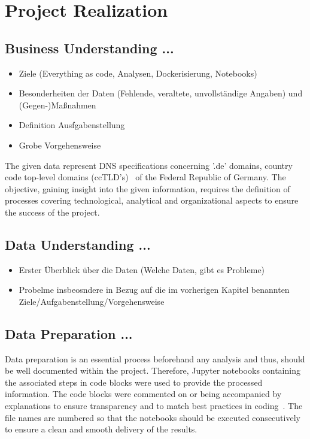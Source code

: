 \section{Project Realization}\label{sec:project-realization}

\subsection{Business Understanding ...}\label{subsec:businessunderstanding}
\begin{itemize}
    \item Ziele (Everything as code, Analysen, Dockerisierung, Notebooks)
    \item Besonderheiten der Daten (Fehlende, veraltete, unvollständige Angaben) und (Gegen-)Maßnahmen
    \item Definition Ausfgabenstellung
    \item Grobe Vorgehensweise
\end{itemize}

The given data represent DNS specifications concerning '.de' domains, country code top-level domains (ccTLD's)~\autocite[cf.][]{DENICeG.03.07.2021} of the Federal Republic of Germany.
The objective, gaining insight into the given information, requires the definition of processes covering technological, analytical and organizational aspects to ensure the success of the project.

\subsection{Data Understanding ...}\label{subsec:dataunderstanding}
\begin{itemize}
    \item Erster Überblick über die Daten (Welche Daten, gibt es Probleme)
    \item Probelme insbeosndere in Bezug auf die im vorherigen Kapitel benannten Ziele/Aufgabenstellung/Vorgehensweise
\end{itemize}

\subsection{Data Preparation ...}\label{subsec:datapreparation}
Data preparation is an essential process beforehand any analysis and thus, should be well documented within the project.
Therefore, Jupyter notebooks containing the associated steps in code blocks were used to provide the processed information.
The code blocks were commented on or being accompanied by explanations to ensure transparency and to match best practices in coding~\autocite[cf.][]{Kosourova.23.4.2021}.
The file names are numbered so that the notebooks should be executed consecutively to ensure a clean and smooth delivery of the results.

